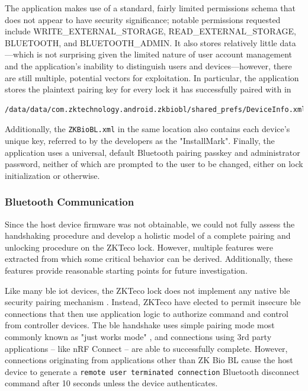 \documentclass[conference]{IEEEtran}
\begin{document}
\bigskip

The application makes use of a standard, fairly limited permissions schema that does not appear to have security significance; notable permissions requested include WRITE\_EXTERNAL\_STORAGE, READ\_EXTERNAL\_STORAGE, BLUETOOTH, and BLUETOOTH\_ADMIN.  It also stores relatively little data---which is not surprising given the limited nature of user account management and the application's inability to distinguish users and devices---however, there are still multiple, potential vectors for exploitation.  In particular, the application stores the plaintext pairing key for every lock it has successfully paired with in 

\begin{lstlisting}[caption=information storage location, captionpos=b]
/data/data/com.zktechnology.android.zkbiobl/shared_prefs/DeviceInfo.xml
\end{lstlisting}

Additionally, the \verb|ZKBioBL.xml| in the same location also contains each device's unique key, referred to by the developers as the "InstallMark".  Finally, the application uses a universal, default Bluetooth pairing passkey and administrator password, neither of which are prompted to the user to be changed, either on lock initialization or otherwise.

\bigskip
\subsubsection{Bluetooth Communication}

Since the host device firmware was not obtainable, we could not fully assess the handshaking procedure and develop a holistic model of a complete pairing and unlocking procedure on the ZKTeco lock.  However, multiple features were extracted from which some critical behavior can be derived.  Additionally, these features provide reasonable starting points for future investigation.

\bigskip

Like many \gls{ble} \gls{iot} devices, the ZKTeco lock does not implement any native \gls{ble} security pairing mechanism \cite{Newman2019}.  Instead, ZKTeco have elected to permit insecure \gls{ble} connections that then use application logic to authorize command and control from controller devices.  The \gls{ble} handshake uses simple pairing mode most commonly known as "just works mode"  \cite{BluetoothSIG2019}, and connections using 3rd party applications -- like nRF Connect -- are able to successfully complete.  However, connections originating from applications other than ZK Bio BL cause the host device to generate a \verb|remote user terminated connection| Bluetooth disconnect command after 10 seconds unless the device authenticates.
\end{document}

